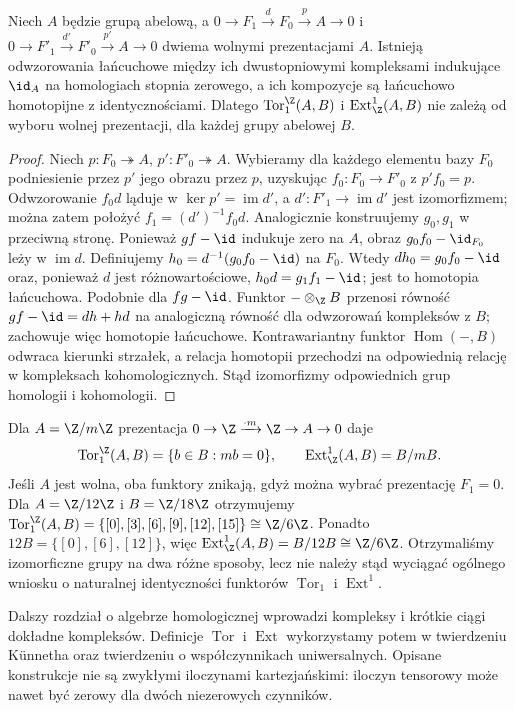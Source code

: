 \begin{lemat}
Niech $A$ będzie grupą abelową, a
$0\to F_1\xrightarrow{d}F_0\xrightarrow{p}A\to0$
i $0\to F'_1\xrightarrow{d'}F'_0\xrightarrow{p'}A\to0$
dwiema wolnymi prezentacjami $A$.
Istnieją odwzorowania łańcuchowe między ich dwustopniowymi
kompleksami indukujące $\id_A$ na homologiach stopnia
zerowego, a ich kompozycje są łańcuchowo homotopijne
z identycznościami. Dlatego $\operatorname{Tor}_1^\Z(A,B)$
i $\operatorname{Ext}^1_\Z(A,B)$ nie zależą od wyboru
wolnej prezentacji, dla każdej grupy abelowej $B$.
\end{lemat}
\begin{proof}
Niech $p:F_0\twoheadrightarrow A$, $p':F'_0\twoheadrightarrow A$.
Wybieramy dla każdego elementu bazy $F_0$ podniesienie przez
$p'$ jego obrazu przez $p$, uzyskując $f_0:F_0\to F'_0$
z $p'f_0=p$. Odwzorowanie $f_0d$ ląduje w $\ker p'=\operatorname{im}d'$, 
a $d':F'_1\to\operatorname{im}d'$ jest izomorfizmem;
można zatem położyć $f_1=(d')^{-1}f_0d$.
Analogicznie konstruujemy $g_0,g_1$ w przeciwną stronę.
Ponieważ $gf-\id$ indukuje zero na $A$, obraz
$g_0f_0-\id_{F_0}$ leży w $\operatorname{im}d$.
Definiujemy $h_0=d^{-1}(g_0f_0-\id)$ na $F_0$.
Wtedy $dh_0=g_0f_0-\id$ oraz, ponieważ $d$ jest
różnowartościowe, $h_0d=g_1f_1-\id$;
jest to homotopia łańcuchowa.
Podobnie dla $fg-\id$. Funktor $-\otimes_\Z B$ przenosi równość
$gf-\id=dh+hd$ na analogiczną równość dla
odwzorowań kompleksów z $B$;
zachowuje więc homotopie łańcuchowe.
Kontrawariantny funktor $\operatorname{Hom}(-,B)$
odwraca kierunki strzałek, a relacja homotopii
przechodzi na odpowiednią relację w kompleksach
kohomologicznych.
Stąd izomorfizmy odpowiednich grup homologii i kohomologii.
\end{proof}
\begin{przyklad}
Dla $A=\Z/m\Z$ prezentacja
$0\to\Z\xrightarrow{\cdot m}\Z\to A\to0$ daje
\[
\operatorname{Tor}_1^\Z(A,B)=\{b\in B:mb=0\},\qquad
\operatorname{Ext}^1_\Z(A,B)=B/mB.
\]
Jeśli $A$ jest wolna, oba funktory znikają, gdyż można
wybrać prezentację $F_1=0$.
Dla $A=\Z/12\Z$ i $B=\Z/18\Z$ otrzymujemy
$\operatorname{Tor}_1^\Z(A,B)
=\{[0],[3],[6],[9],[12],[15]\}\cong\Z/6\Z$.
Ponadto $12B=\{[0],[6],[12]\}$,
więc $\operatorname{Ext}^1_\Z(A,B)=B/12B
\cong\Z/6\Z$.
Otrzymaliśmy izomorficzne grupy na dwa różne sposoby,
lecz nie należy stąd wyciągać ogólnego wniosku
o naturalnej identyczności funktorów
$\operatorname{Tor}_1$ i $\operatorname{Ext}^1$.
\end{przyklad}
\begin{uwaga}
Dalszy rozdział o algebrze homologicznej wprowadzi
kompleksy i krótkie ciągi dokładne kompleksów. Definicje
$\operatorname{Tor}$ i $\operatorname{Ext}$ wykorzystamy potem
w twierdzeniu Künnetha oraz twierdzeniu o współczynnikach
uniwersalnych. Opisane konstrukcje nie są zwykłymi iloczynami
kartezjańskimi: iloczyn tensorowy może nawet być
zerowy dla dwóch niezerowych czynników.
\end{uwaga}
\clearpage


